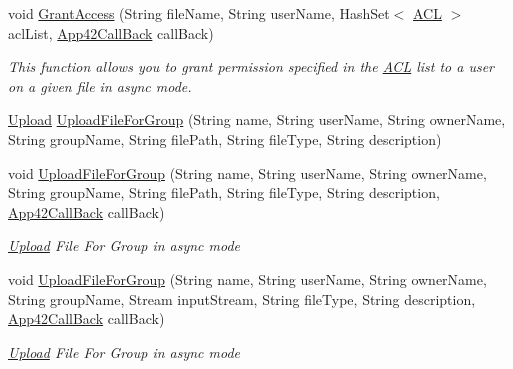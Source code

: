 \begin{DoxyCompactItemize}
void \hyperlink{classcom_1_1shephertz_1_1app42_1_1paas_1_1sdk_1_1csharp_1_1upload_1_1_upload_service_a6afa070d72c9ae64a35ce4349ebf8165}{Grant\+Access} (String file\+Name, String user\+Name, Hash\+Set$<$ \hyperlink{classcom_1_1shephertz_1_1app42_1_1paas_1_1sdk_1_1csharp_1_1_a_c_l}{A\+C\+L} $>$ acl\+List, \hyperlink{interfacecom_1_1shephertz_1_1app42_1_1paas_1_1sdk_1_1csharp_1_1_app42_call_back}{App42\+Call\+Back} call\+Back)
\begin{DoxyCompactList}\small\item\em This function allows you to grant permission specified in the \hyperlink{classcom_1_1shephertz_1_1app42_1_1paas_1_1sdk_1_1csharp_1_1_a_c_l}{A\+C\+L} list to a user on a given file in async mode. \end{DoxyCompactList}\item 
\hyperlink{classcom_1_1shephertz_1_1app42_1_1paas_1_1sdk_1_1csharp_1_1upload_1_1_upload}{Upload} \hyperlink{classcom_1_1shephertz_1_1app42_1_1paas_1_1sdk_1_1csharp_1_1upload_1_1_upload_service_a2a22343400fd54a7080ac789d0e6d370}{Upload\+File\+For\+Group} (String name, String user\+Name, String owner\+Name, String group\+Name, String file\+Path, String file\+Type, String description)
\item 
void \hyperlink{classcom_1_1shephertz_1_1app42_1_1paas_1_1sdk_1_1csharp_1_1upload_1_1_upload_service_a3a036b893dc5d2a94f4816d9d0b754ab}{Upload\+File\+For\+Group} (String name, String user\+Name, String owner\+Name, String group\+Name, String file\+Path, String file\+Type, String description, \hyperlink{interfacecom_1_1shephertz_1_1app42_1_1paas_1_1sdk_1_1csharp_1_1_app42_call_back}{App42\+Call\+Back} call\+Back)
\begin{DoxyCompactList}\small\item\em \hyperlink{classcom_1_1shephertz_1_1app42_1_1paas_1_1sdk_1_1csharp_1_1upload_1_1_upload}{Upload} File For Group in async mode \end{DoxyCompactList}\item 
void \hyperlink{classcom_1_1shephertz_1_1app42_1_1paas_1_1sdk_1_1csharp_1_1upload_1_1_upload_service_aee5690dce2afb5c6c7b0402a83cb5332}{Upload\+File\+For\+Group} (String name, String user\+Name, String owner\+Name, String group\+Name, Stream input\+Stream, String file\+Type, String description, \hyperlink{interfacecom_1_1shephertz_1_1app42_1_1paas_1_1sdk_1_1csharp_1_1_app42_call_back}{App42\+Call\+Back} call\+Back)
\begin{DoxyCompactList}\small\item\em \hyperlink{classcom_1_1shephertz_1_1app42_1_1paas_1_1sdk_1_1csharp_1_1upload_1_1_upload}{Upload} File For Group in async mode \end{DoxyCompactList}\item 

\end{DoxyCompactItemize}

